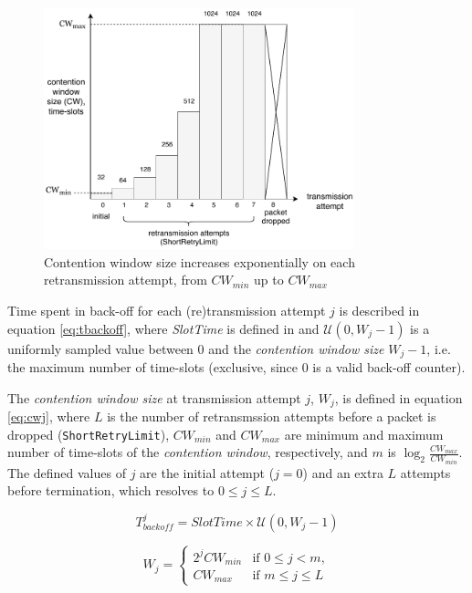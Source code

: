 \begin{figure}
\center
\includegraphics[width=0.8\textwidth]{images/contention-window-sizes.pdf}
\caption{Contention window size increases exponentially on each retransmission attempt, from $\mathit{CW}_{min}$ up to $\mathit{CW}_{max}$}
\label{fig:cwsizes}
\end{figure}

Time spent in back-off for each (re)transmission attempt $j$ is described in
equation \ref{eq:tbackoff}, where \emph{SlotTime} is defined in \cite{654749}
and $\mathcal{U}(0,W_j-1)$ is a uniformly sampled value between $0$ and the
\emph{contention window size} $W_{j}-1$, i.e. the maximum number of
time-slots (exclusive, since 0 is a valid back-off counter). 

The \emph{contention window size} at transmission attempt $j$, $W_{j}$, is
defined in equation \ref{eq:cwj}, where $L$ is the number of retransmssion
attempts before a packet is dropped (\texttt{ShortRetryLimit}),
$\mathit{CW}_{min}$ and $\mathit{CW}_{max}$ are minimum and maximum number of
time-slots of the \emph{contention window}, respectively, and $m$ is $\log_2
\frac{\mathit{CW}_{max}}{\mathit{CW}_{min}}$. The defined values of $j$ are
the initial attempt ($j=0$) and an extra $L$ attempts before termination,
which resolves to $0 \leq j \leq L$.

\begin{equation} \label{eq:tbackoff}
T^j_{\mathit{backoff}} = \mathit{SlotTime} \times \mathcal{U}(0,W_j-1)
\end{equation}

\begin{equation} \label{eq:cwj}
W_j = \left\{
	\begin{array}{ll}
		2^j \mathit{CW}_{min}  & \mbox{if } 0 \leq j < m, \\
		\mathit{CW}_{max}      & \mbox{if } m \leq j \leq L
	\end{array}
\right.
\end{equation}

